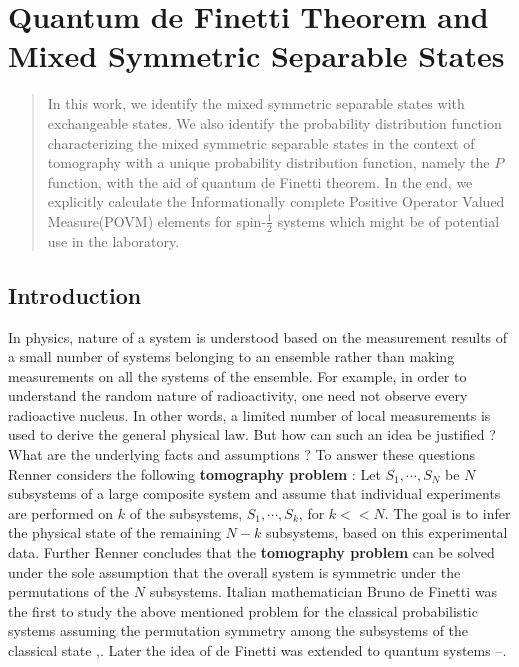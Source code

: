 \chapter[Quantum de Finetti Theorem and Mixed Symmetric Separable States]{Quantum de Finetti Theorem and Mixed Symmetric Separable States}\label{chap27}




\begin{abstract}
In this work, we identify the mixed symmetric separable states with exchangeable states. We also identify the probability distribution function characterizing the mixed symmetric separable states in the context of tomography with a unique probability distribution function, namely the $P$ function, with the aid of quantum de Finetti theorem. In the end, we explicitly calculate the Informationally complete Positive Operator Valued Measure(POVM) elements for spin-$\frac{1}{2}$ systems which might be of potential use in the laboratory.
\end{abstract}

\section{Introduction}\label{chap27-sec1}

In physics, nature of a system is understood based on the measurement results of a small number of systems belonging to an ensemble rather than making measurements on all the systems of the ensemble. For example, in order to understand the random nature of radioactivity, one need not observe every radioactive nucleus. In other words, a limited number of local measurements is used to derive the general physical law. But how can such an idea be justified ? What are the underlying facts and assumptions ? To answer these questions Renner \cite{chap27-key1} considers the following \textbf{tomography problem} : Let $S_{1},\cdots,S_{N}$ be $N$ subsystems of a large composite system and assume that individual experiments are performed on $k$ of the subsystems, $S_{1},\cdots,S_{k}$, for $k<<N$. The goal is to infer the physical state of the remaining $N-k$ subsystems, based on this experimental data. Further Renner\cite{chap27-key1} concludes that the \textbf{tomography problem} can be solved under the sole assumption that the overall system is symmetric under the permutations of the $N$ subsystems. Italian mathematician Bruno de Finetti was the first to study the above mentioned problem for the classical probabilistic systems assuming the permutation symmetry among the subsystems of the classical state \cite{chap27-key2},\cite{chap27-key3}. Later the idea of de Finetti was extended to quantum systems \cite{chap27-key4}--\cite{chap27-key7}.

